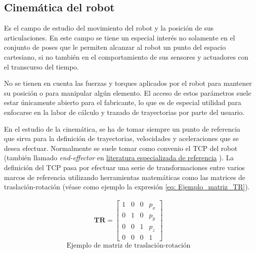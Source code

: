 \subsection{Cinemática del robot}
Es el campo de estudio del movimiento del robot y la posición de sus articulaciones. En este campo se tiene un especial interés no solamente en el conjunto de poses que le permiten alcanzar al robot un punto del espacio cartesiano, si no también en el comportamiento de sus sensores y actuadores con el transcurso del tiempo. 

No se tienen en cuenta las fuerzas y torques aplicados por el robot para mantener su posición o para manipular algún elemento. El acceso de estos parámetros suele estar únicamente abierto para el fabricante, lo que es de especial utilidad para enfocarse en la labor de cálculo y trazado de trayectorias por parte del usuario.

En el estudio de la cinemática, se ha de tomar siempre un punto de referencia que sirva para la definición de trayectorias, velocidades y aceleraciones que se desea efectuar. Normalmente se suele tomar como convenio el \acrshort{TCP} del robot (también llamado \textit{end-effector} en \href{https://hades.mech.northwestern.edu/images/7/7f/MR.pdf}{literatura especializada de referencia} \cite{Modern_Robotics}). La definición del \acrshort{TCP} pasa por efectuar una serie de transformaciones entre varios marcos de referencia utilizando herramientas matemáticas como las matrices de traslación-rotación (véase como ejemplo la expresión \ref{eq: Ejemplo_matriz_TR}). 

\begin{equation}
\begin{gathered}
    \textbf{TR} =
    \begin{bmatrix}
    1 & 0 & 0 & p_x \\
    0 & 1 & 0 & p_y \\
    0 & 0 & 1 & p_z \\
    0 & 0 & 0 & 1 
    \end{bmatrix}
    \label{eq: Ejemplo_matriz_TR}
\end{gathered}
\end{equation}
\begin{equation*}
\text{Ejemplo de matriz de traslación-rotación}
\end{equation*}

